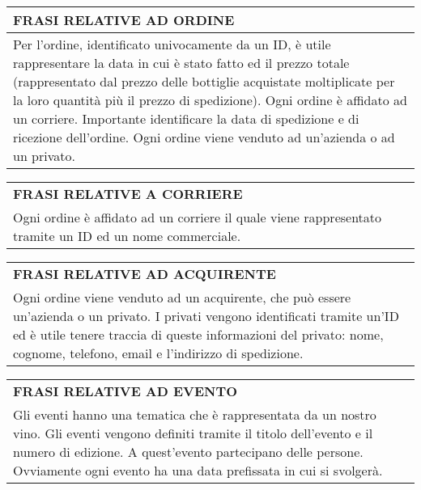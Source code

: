 \begin{center}
	\begin{tabular}{P{16cm}}
		\toprule
		 \textbf {\large {FRASI RELATIVE AD ORDINE}} \\
		\midrule
		Per l'ordine, identificato univocamente da un ID, è utile rappresentare la data in cui è stato fatto ed il prezzo totale (rappresentato dal prezzo delle bottiglie acquistate moltiplicate per la loro quantità più il prezzo di spedizione). Ogni ordine è affidato ad un corriere. Importante identificare la data  di spedizione e di ricezione dell'ordine. Ogni ordine viene venduto ad un'azienda o ad un privato.\\
		\bottomrule
	\end{tabular}
	
	\vspace{0.5cm}
	
	\begin{tabular}{P{16cm}}
		\toprule
		 \textbf {\large {FRASI RELATIVE A CORRIERE}} \\
		Ogni ordine è affidato ad un corriere il quale viene rappresentato tramite un ID ed un nome commerciale.\\
		\bottomrule
	\end{tabular}
	
	\vspace{0.5cm}
	
	\begin{tabular}{P{16cm}}
		\toprule
		 \textbf {\large {FRASI RELATIVE AD ACQUIRENTE}} \\
		Ogni ordine viene venduto ad un acquirente, che può essere un'azienda o un privato. I privati vengono identificati tramite un'ID ed è utile tenere traccia di queste informazioni del privato: nome, cognome, telefono, email e l'indirizzo di spedizione.\\
		\bottomrule
	\end{tabular}
	
	\vspace{0.5cm}
	
	\begin{tabular}{P{16cm}}
		\toprule
		 \textbf {\large {FRASI RELATIVE AD EVENTO}} \\
		Gli eventi hanno una tematica che è rappresentata da un nostro vino. Gli eventi vengono definiti tramite il titolo dell'evento e il numero di edizione. A quest'evento partecipano delle persone. Ovviamente ogni evento ha una data prefissata in cui si svolgerà.\\
		\bottomrule
	\end{tabular}
	

\end{center}
